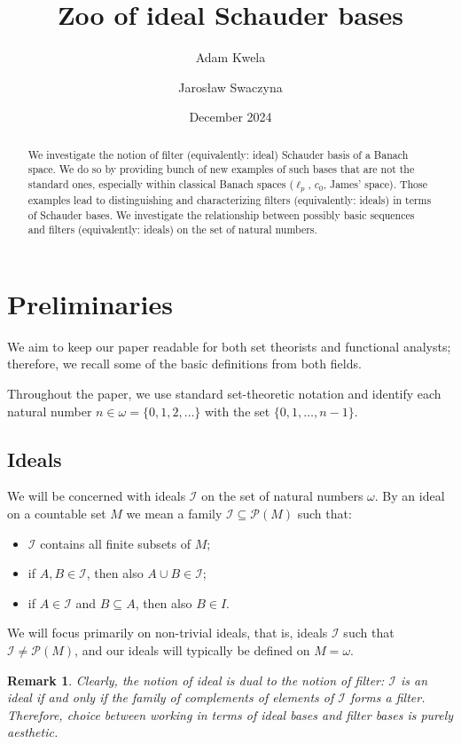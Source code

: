 \documentclass{amsart}
\title{Zoo of ideal Schauder bases}
\author{Adam Kwela}
\author{Jaros{\l}aw Swaczyna}
\date{December 2024}
\newcommand{\I}{\mathcal{I}}
\newtheorem{remark}[theorem]{Remark}
\begin{document}
\begin{abstract}

We investigate the notion of filter (equivalently: ideal) Schauder basis of a Banach space. We do so by providing bunch of new examples of such bases that are not the standard ones, especially within classical Banach spaces ($\ell_p$, $c_0$, James' space). Those examples lead to distinguishing and characterizing filters (equivalently: ideals) in terms of Schauder bases. We investigate the relationship between possibly basic sequences and filters (equivalently: ideals) on the set of natural numbers. 
\end{abstract}

\maketitle

\section{Preliminaries}
We aim to keep our paper readable for both set theorists and functional analysts; therefore, we recall some of the basic definitions from both fields.

Throughout the paper, we use standard set-theoretic notation and identify each natural number $n\in\omega=\{0,1,2,\ldots\}$ with the set $\{0,1,\ldots,n-1\}$.

\subsection{Ideals}
We will be concerned with ideals $\I$ on the set of natural numbers $\omega$. By an ideal on a countable set $M$ we mean a family $\I \subseteq \mathcal{P}(M)$ such that:
\begin{itemize}
    \item $\I$ contains all finite subsets of $M$;
    \item if $A,B \in \I$, then also $A\cup B \in \I$;
    \item if $A \in \I$ and $B \subseteq A$, then also $B \in I$.
\end{itemize}
We will focus primarily on non-trivial ideals, that is, ideals $\I$ such that $\I \neq \mathcal{P}(M)$, and our ideals will typically be defined on $M=\omega$. 

\begin{remark}
Clearly, the notion of ideal is dual to the notion of filter: $\I$ is an ideal if and only if the family of complements of elements of $\I$ forms a filter. Therefore, choice between working in terms of ideal bases and filter bases is purely aesthetic.
\end{remark}    
\end{document}
